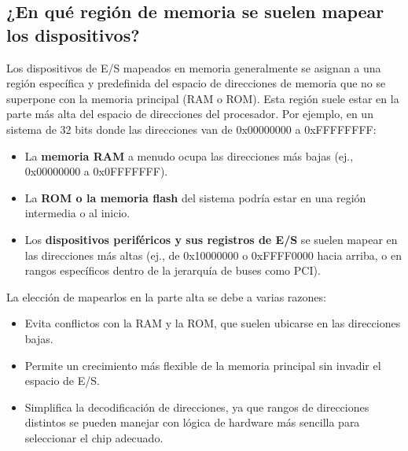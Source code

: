 \documentclass[12pt, a4paper]{article}
\begin{document}
\subsection*{¿En qué región de memoria se suelen mapear los dispositivos?}
Los dispositivos de E/S mapeados en memoria generalmente se asignan a una región específica y predefinida del espacio de direcciones de memoria que no se superpone con la memoria principal (RAM o ROM). Esta región suele estar en la parte más alta del espacio de direcciones del procesador. Por ejemplo, en un sistema de 32 bits donde las direcciones van de 0x00000000 a 0xFFFFFFFF:
\begin{itemize}
    \item La \textbf{memoria RAM} a menudo ocupa las direcciones más bajas (ej., 0x00000000 a 0x0FFFFFFF).
    \item La \textbf{ROM o la memoria flash} del sistema podría estar en una región intermedia o al inicio.
    \item Los \textbf{dispositivos periféricos y sus registros de E/S} se suelen mapear en las direcciones más altas (ej., de 0x10000000 o 0xFFFF0000 hacia arriba, o en rangos específicos dentro de la jerarquía de buses como PCI).
\end{itemize}
La elección de mapearlos en la parte alta se debe a varias razones:
\begin{itemize}
    \item Evita conflictos con la RAM y la ROM, que suelen ubicarse en las direcciones bajas.
    \item Permite un crecimiento más flexible de la memoria principal sin invadir el espacio de E/S.
    \item Simplifica la decodificación de direcciones, ya que rangos de direcciones distintos se pueden manejar con lógica de hardware más sencilla para seleccionar el chip adecuado.
\end{itemize}
\end{document}
